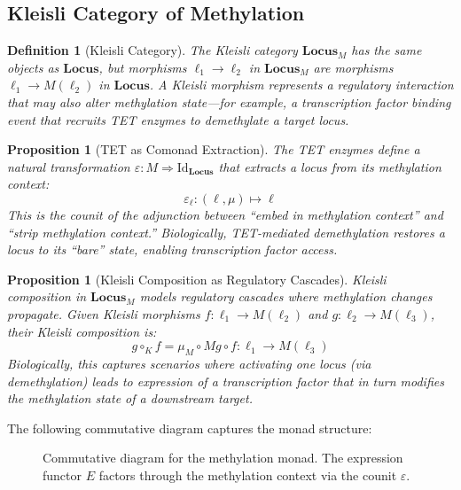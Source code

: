 \documentclass[12pt,a4paper]{article}
\newtheorem{proposition}[theorem]{Proposition}
\newtheorem{definition}[theorem]{Definition}
\newcommand{\cat}[1]{\mathbf{#1}}
\begin{document}
\subsection{Kleisli Category of Methylation}

\begin{definition}[Kleisli Category]
\label{def:kleisli}
The \emph{Kleisli category} $\cat{Locus}_M$ has the same objects as $\cat{Locus}$, but morphisms $\ell_1 \to \ell_2$ in $\cat{Locus}_M$ are morphisms $\ell_1 \to M(\ell_2)$ in $\cat{Locus}$. A Kleisli morphism represents a regulatory interaction that may also alter methylation state---for example, a transcription factor binding event that recruits TET enzymes to demethylate a target locus.
\end{definition}

\begin{proposition}[TET as Comonad Extraction]
\label{prop:tet-counit}
The TET enzymes define a natural transformation $\varepsilon : M \Rightarrow \mathrm{Id}_{\cat{Locus}}$ that extracts a locus from its methylation context:
\[
    \varepsilon_\ell : (\ell, \mu) \mapsto \ell
\]
This is the counit of the adjunction between ``embed in methylation context'' and ``strip methylation context.'' Biologically, TET-mediated demethylation restores a locus to its ``bare'' state, enabling transcription factor access.
\end{proposition}

\begin{proposition}[Kleisli Composition as Regulatory Cascades]
\label{prop:kleisli-compose}
Kleisli composition in $\cat{Locus}_M$ models regulatory cascades where methylation changes propagate. Given Kleisli morphisms $f : \ell_1 \to M(\ell_2)$ and $g : \ell_2 \to M(\ell_3)$, their Kleisli composition is:
\[
    g \circ_K f = \mu_M \circ Mg \circ f : \ell_1 \to M(\ell_3)
\]
Biologically, this captures scenarios where activating one locus (via demethylation) leads to expression of a transcription factor that in turn modifies the methylation state of a downstream target.
\end{proposition}

The following commutative diagram captures the monad structure:

\begin{figure}[H]
\centering
{}
\caption{Commutative diagram for the methylation monad. The expression functor $E$ factors through the methylation context via the counit $\varepsilon$.}
\label{fig:meth-monad}
\end{figure}
\end{document}
